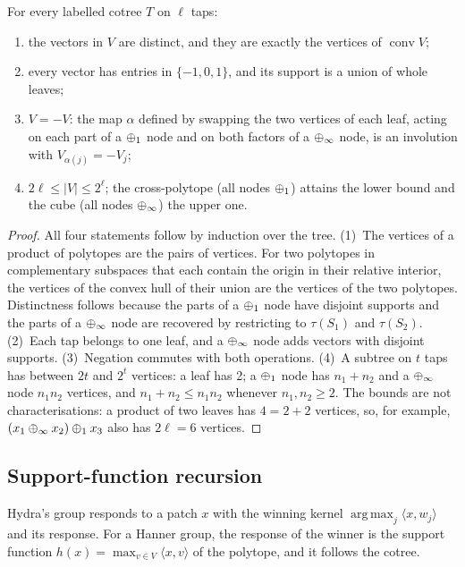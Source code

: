 \begin{proposition}
\label{prop:structure}
For every labelled cotree $T$ on $\ell$ taps:
\begin{enumerate}
\item the vectors in $V$ are distinct, and they are exactly the vertices of
  $\operatorname{conv}V$;
\item every vector has entries in $\{-1,0,1\}$, and its support is a union of whole
  leaves;
\item $V=-V$: the map $\alpha$ defined by swapping the two vertices of each leaf, acting
  on each part of a $\oplus_1$ node and on both factors of a $\oplus_\infty$ node, is an involution
  with $V_{\alpha(j)}=-V_j$;
\item $2\ell\le|V|\le 2^\ell$; the cross-polytope (all nodes $\oplus_1$) attains the lower
  bound and the cube (all nodes $\oplus_\infty$) the upper one.
\end{enumerate}
\end{proposition}

\begin{proof}
All four statements follow by induction over the tree. (1)~The vertices of a product of
polytopes are the pairs of vertices. For two polytopes in complementary subspaces that each
contain the origin in their relative interior, the vertices of the convex hull of their union
are the vertices of the two polytopes. Distinctness follows because the parts of a $\oplus_1$
node have disjoint supports and the parts of a $\oplus_\infty$ node are recovered by restricting to
$\tau(S_1)$ and $\tau(S_2)$. (2)~Each tap belongs to one leaf, and a $\oplus_\infty$ node adds vectors
with disjoint supports. (3)~Negation commutes with both operations. (4)~A subtree on $t$
taps has between $2t$ and $2^t$ vertices: a leaf has 2; a $\oplus_1$ node has $n_1+n_2$ and a
$\oplus_\infty$ node $n_1n_2$ vertices, and $n_1+n_2\le n_1n_2$ whenever $n_1,n_2\ge2$. The bounds
are not characterisations: a product of two leaves has $4=2+2$ vertices, so, for example,
$(x_1\oplus_\infty x_2)\oplus_1 x_3$ also has $2\ell=6$ vertices.
\end{proof}

\subsection{Support-function recursion}
\label{sec:recursion}

Hydra's group responds to a patch $x$ with the winning kernel
$\operatorname{arg\,max}_j\langle x,w_j\rangle$ and its response. For a Hanner group, the
response of the winner is the support function $h(x)=\max_{v\in V}\langle x,v\rangle$ of
the polytope, and it follows the cotree.

